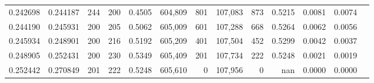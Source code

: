 \begin{tabular}{rrrrrrrrrrrrr}
0.242698 & 0.244187 &   244 & 200 &                                     0.4505 & 604,809 &     801 & 107,083 &     873 & 0.5215 & 0.0081 & 0.0074 \\
0.244190 & 0.245931 &   200 & 205 &                                     0.5062 & 605,009 &     601 & 107,288 &     668 & 0.5264 & 0.0062 & 0.0056 \\
0.245934 & 0.248901 &   200 & 216 &                                     0.5192 & 605,209 &     401 & 107,504 &     452 & 0.5299 & 0.0042 & 0.0037 \\
0.248905 & 0.252431 &   200 & 230 &                                     0.5349 & 605,409 &     201 & 107,734 &     222 & 0.5248 & 0.0021 & 0.0019 \\
0.252442 & 0.270849 &   201 & 222 &                                     0.5248 & 605,610 &       0 & 107,956 &       0 &    nan & 0.0000 & 0.0000 \\
\bottomrule
\end{tabular}
